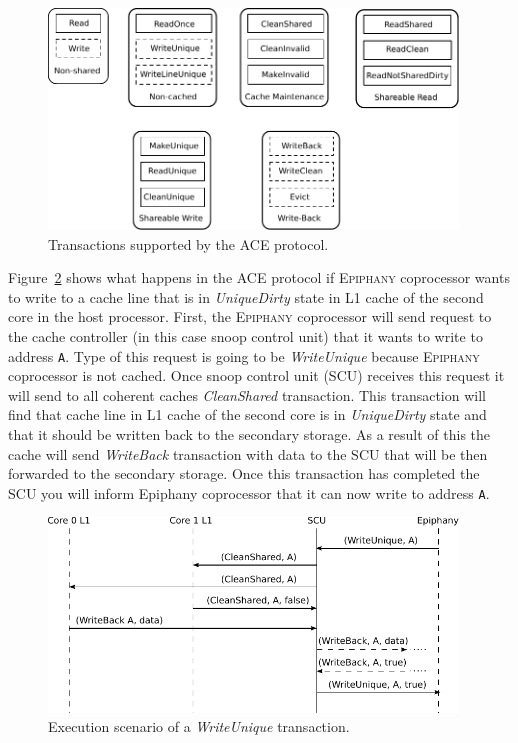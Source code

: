 \documentclass{hitec}
\begin{document}
\begin{figure}
\begin{center}
\includegraphics[width=0.97\textwidth,keepaspectratio=true]{acetransactions.pdf}
\end{center}
\caption{Transactions supported by the \textsc{ACE} protocol.}
\label{fig:acetrans}
\end{figure}

Figure~\ref{fig:aceexec} shows what happens in the \textsc{ACE} protocol if
\textsc{Epiphany} coprocessor wants to write to a cache line that is in
\textit{UniqueDirty} state in L1 cache of the second core in the host
processor. First, the \textsc{Epiphany} coprocessor will send request to the
cache controller (in this case snoop control unit) that it wants to write to
address \texttt{A}. Type of this request is going to be \textit{WriteUnique}
because \textsc{Epiphany} coprocessor is not cached. Once snoop control unit
(SCU) receives this request it will send to all coherent caches
\textit{CleanShared} transaction. This transaction will find that cache line in L1
cache of the second core is in \textit{UniqueDirty} state and that it should be
written back to the secondary storage. As a result of this the cache will send
\textit{WriteBack} transaction with data to the SCU that will be then forwarded
to the secondary storage. Once this transaction has completed the SCU you will
inform Epiphany coprocessor that it can now write to address \texttt{A}.

\begin{figure}
\begin{center}
\includegraphics[width=0.97\textwidth,keepaspectratio=true]{aceexec.pdf}
\end{center}
\caption{Execution scenario of a \textit{WriteUnique} transaction.}
\label{fig:aceexec}
\end{figure}
\end{document}
